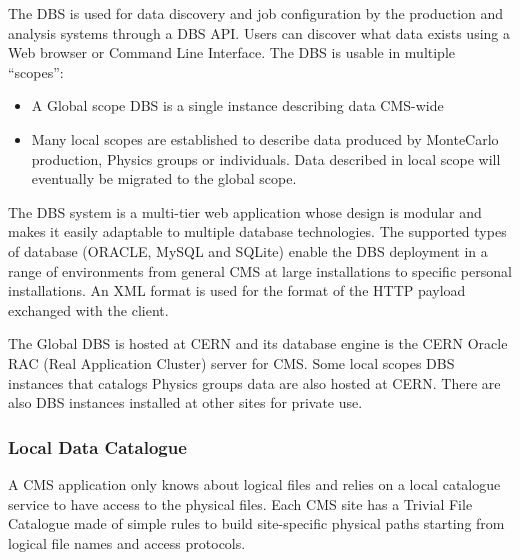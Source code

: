 The DBS is used for data discovery and job configuration by the production and analysis systems through a DBS API. 
Users can discover what data exists using a Web browser or Command Line Interface.
The DBS is usable in multiple “scopes”:
\begin{itemize}
\item A Global scope DBS is a single instance describing data CMS-wide %
\item Many local scopes are established to describe data produced by MonteCarlo production, Physics groups or individuals. Data described in local scope will eventually be migrated to the global scope. 
\end{itemize}
The DBS system is a multi-tier web application whose design is modular and makes it easily adaptable to multiple database technologies. The supported types of database (ORACLE, MySQL and SQLite) enable the DBS deployment in a range of environments from general CMS at large installations to specific personal installations.
An XML format is used for the format of the HTTP payload exchanged with the client.

The Global DBS is hosted at CERN and its database engine is the CERN Oracle RAC (Real Application Cluster) server for CMS. Some local scopes DBS instances that catalogs Physics groups data are also hosted at CERN. There are also DBS instances installed at other sites for private use. 

\subsubsection{Local Data Catalogue}
\label{sec:3_1_2}
A CMS application only knows about logical files and relies on a local catalogue service to have access to the physical files.
Each CMS site has a Trivial File Catalogue made of simple rules to build site-specific physical paths starting from logical file names and access protocols.


